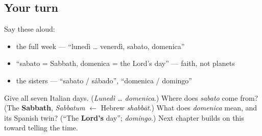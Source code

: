 \subsection*{Your turn}
Say these aloud:

\begin{itemize}
\raggedright
  \item the full week — \textquotedblleft{}lunedì … venerdì, sabato, domenica\textquotedblright{}
  \item \textquotedblleft{}sabato = Sabbath, domenica = the Lord's day\textquotedblright{} — faith, not planets
  \item the sisters — \textquotedblleft{}sabato / sábado\textquotedblright{}, \textquotedblleft{}domenica / domingo\textquotedblright{}
\end{itemize}

\begin{tcolorbox}[breakable,colback=teal!4,colframe=teal!35!black,title={Before you move on}]
Give all seven Italian days. (\emph{Lunedì … domenica}.) Where does \emph{sabato} come from? (The \textbf{Sabbath}, \emph{Sabbatum} $\leftarrow$ Hebrew \emph{shabbāt}.) What does \emph{domenica} mean, and its Spanish twin? (\textquotedblleft{}The \textbf{Lord's} day\textquotedblright{}; \emph{domingo}.) Next chapter builds on this toward telling the time.
\end{tcolorbox}
